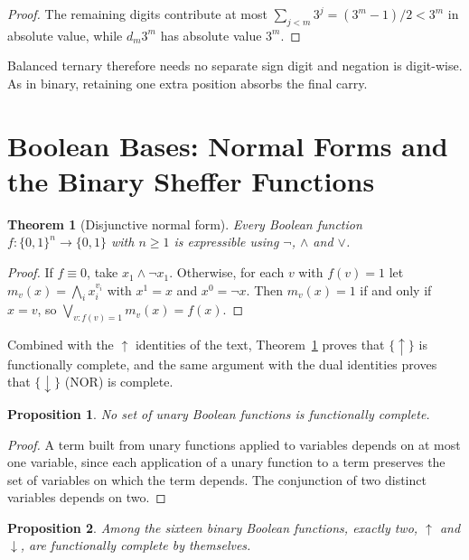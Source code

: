 \documentclass[11pt]{article}
\newtheorem{proposition}{Proposition}
\newtheorem{theorem}{Theorem}
\theoremstyle{definition}
\theoremstyle{remark}
\newcommand{\nand}{\uparrow}
\begin{document}
\begin{proof}
The remaining digits contribute at most $\sum_{j<m} 3^{j} = (3^{m} - 1)/2 < 3^{m}$ in absolute value, while $d_m 3^m$ has absolute value $3^m$.
\end{proof}

Balanced ternary therefore needs no separate sign digit and negation is digit-wise. As in binary, retaining one extra position absorbs the final carry.

\section{Boolean Bases: Normal Forms and the Binary Sheffer Functions}\label{app:bool}

\begin{theorem}[Disjunctive normal form]\label{thm:dnf}
Every Boolean function $f : \{0,1\}^n \to \{0,1\}$ with $n \ge 1$ is expressible using $\neg$, $\land$ and $\lor$.
\end{theorem}

\begin{proof}
If $f \equiv 0$, take $x_1 \land \neg x_1$. Otherwise, for each $v$ with $f(v) = 1$ let $m_v(x) = \bigwedge_i x_i^{v_i}$ with $x^1 = x$ and $x^0 = \neg x$. Then $m_v(x) = 1$ if and only if $x = v$, so $\bigvee_{v : f(v) = 1} m_v(x) = f(x)$.
\end{proof}

Combined with the $\nand$ identities of the text, Theorem~\ref{thm:dnf} proves that $\{\nand\}$ is functionally complete, and the same argument with the dual identities proves that $\{\downarrow\}$ (NOR) is complete.

\begin{proposition}\label{prop:nounary}
No set of unary Boolean functions is functionally complete.
\end{proposition}

\begin{proof}
A term built from unary functions applied to variables depends on at most one variable, since each application of a unary function to a term preserves the set of variables on which the term depends. The conjunction of two distinct variables depends on two.
\end{proof}

\begin{proposition}\label{prop:onlybinary}
Among the sixteen binary Boolean functions, exactly two, $\nand$ and $\downarrow$, are functionally complete by themselves.
\end{proposition}
\end{document}
